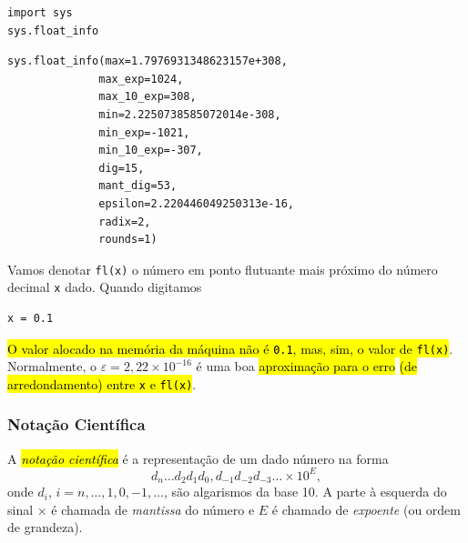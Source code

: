 \begin{lstlisting}
import sys
sys.float_info
\end{lstlisting}

\begin{verbatim}
sys.float_info(max=1.7976931348623157e+308, 
              max_exp=1024, 
              max_10_exp=308, 
              min=2.2250738585072014e-308, 
              min_exp=-1021, 
              min_10_exp=-307, 
              dig=15, 
              mant_dig=53, 
              epsilon=2.220446049250313e-16, 
              radix=2, 
              rounds=1)
\end{verbatim}

Vamos denotar \texttt{fl(x)} o número em ponto flutuante mais próximo do número decimal \texttt{x} dado. Quando digitamos

\begin{lstlisting}
x = 0.1
\end{lstlisting}

\hl{O valor alocado na memória da máquina não é \texttt{0.1}, mas, sim, o valor de \texttt{fl(x)}}. Normalmente, o  $\varepsilon = 2,22\times 10^{-16}$ é uma boa \hl{aproximação para o erro} \hl{(de arredondamento) entre \texttt{x} e \texttt{fl(x)}}.

\subsubsection{Notação Científica}

A \hl{\emph{notação científica}} é a representação de um dado número na forma
\begin{equation}
  d_{n}\ldots d_2d_1d_0,d_{-1}d_{-2}d_{-3}\ldots \times 10^{E},
\end{equation}
onde $d_i$, $i=n, \ldots, 1, 0, -1, \ldots$, são algarismos da base 10. A parte à esquerda do sinal $\times$ é chamada de \emph{mantissa} do número e $E$ é chamado de \emph{expoente} (ou ordem de grandeza).


